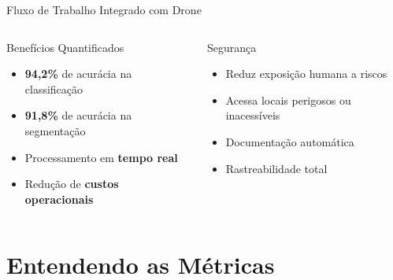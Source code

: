 \documentclass[aspectratio=169, 12pt]{beamer}
\begin{document}
\begin{frame}{Fluxo de Trabalho Integrado com Drone}
    \vspace{0.5cm}

    \begin{columns}[T]
        \begin{block}{Benefícios Quantificados}
            \begin{itemize}
                \item \textbf{94,2\%} de acurácia na classificação
                \item \textbf{91,8\%} de acurácia na segmentação
                \item Processamento em \textbf{tempo real}
                \item Redução de \textbf{custos operacionais}
            \end{itemize}
        \end{block}

        \begin{block}{Segurança}
            \begin{itemize}
                \item Reduz exposição humana a riscos
                \item Acessa locais perigosos ou inacessíveis
                \item Documentação automática
                \item Rastreabilidade total
            \end{itemize}
        \end{block}
    \end{columns}
\end{frame}

\section{Entendendo as Métricas}
\end{document}
